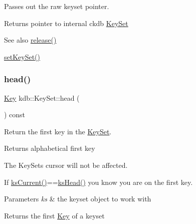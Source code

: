 Passes out the raw keyset pointer. 

\begin{DoxyReturn}{Returns}
pointer to internal ckdb \hyperlink{classkdb_1_1KeySet}{Key\+Set}
\end{DoxyReturn}
\begin{DoxySeeAlso}{See also}
\hyperlink{classkdb_1_1KeySet_a2987b3fb1b12196399650726f1c18f02}{release()} 

\hyperlink{classkdb_1_1KeySet_a9f3ec4eebe304185527b08a6fa01b77c}{set\+Key\+Set()} 
\end{DoxySeeAlso}
\mbox{\label{classkdb_1_1KeySet_a1aca3689ed08cbc909976cdf874cfb59}} 
\subsubsection{\texorpdfstring{head()}{head()}}
{\footnotesize\ttfamily \hyperlink{classkdb_1_1Key}{Key} kdb\+::\+Key\+Set\+::head (\begin{DoxyParamCaption}{ }\end{DoxyParamCaption}) const\hspace{0.3cm}{\ttfamily [inline]}}



Return the first key in the \hyperlink{classkdb_1_1KeySet}{Key\+Set}. 

\begin{DoxyReturn}{Returns}
alphabetical first key
\end{DoxyReturn}
The Key\+Sets cursor will not be affected.

If \hyperlink{group__keyset_ga4287b9416912c5f2ab9c195cb74fb094}{ks\+Current()}==\hyperlink{group__keyset_gae7dbf3aef70e67b5328475eb3d1f92f5}{ks\+Head()} you know you are on the first key.


\begin{DoxyParams}{Parameters}
{\em ks} & the keyset object to work with \\
\hline
\end{DoxyParams}
\begin{DoxyReturn}{Returns}
the first \hyperlink{classkdb_1_1Key}{Key} of a keyset 
\end{DoxyReturn}

